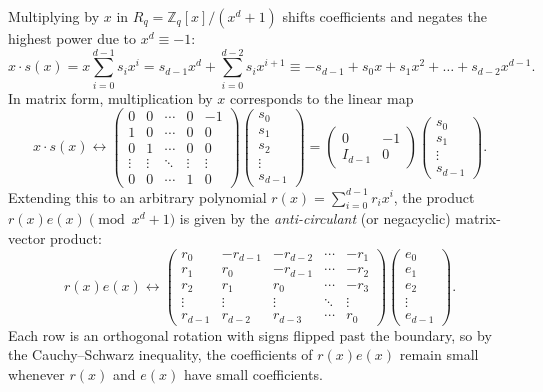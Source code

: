 Multiplying by \(x\) in \(R_q = \mathbb{Z}_q[x] / (x^d + 1)\) shifts coefficients and negates the highest power due to \(x^d \equiv -1\):
\[
    x \cdot s(x) = x \sum_{i=0}^{d-1} s_i x^i = s_{d-1} x^d + \sum_{i=0}^{d-2} s_i x^{i+1} \equiv -s_{d-1} + s_0 x + s_1 x^2 + \dots + s_{d-2} x^{d-1}.
\]
In matrix form, multiplication by \(x\) corresponds to the linear map
\[
    x \cdot s(x) \longleftrightarrow
    \begin{pmatrix}
        0 & 0 & \cdots & 0 & -1 \\
        1 & 0 & \cdots & 0 & 0 \\
        0 & 1 & \cdots & 0 & 0 \\
        \vdots & \vdots & \ddots & \vdots & \vdots \\
        0 & 0 & \cdots & 1 & 0
    \end{pmatrix}
    \begin{pmatrix}
        s_0 \\ s_1 \\ s_2 \\ \vdots \\ s_{d-1}
    \end{pmatrix}
    =
    \begin{pmatrix}
        0 & -1 \\
        I_{d-1} & 0
    \end{pmatrix}
    \begin{pmatrix}
        s_0 \\ s_1 \\ \vdots \\ s_{d-1}
    \end{pmatrix}.
\]
Extending this to an arbitrary polynomial \(r(x) = \sum_{i=0}^{d-1} r_i x^i\), the product \(r(x)e(x) \pmod{x^d + 1}\) is given by the \emph{anti-circulant} (or negacyclic) matrix-vector product:
\[
    r(x) e(x) \longleftrightarrow
    \begin{pmatrix}
        r_0 & -r_{d-1} & -r_{d-2} & \cdots & -r_1 \\
        r_1 & r_0      & -r_{d-1} & \cdots & -r_2 \\
        r_2 & r_1      & r_0      & \cdots & -r_3 \\
        \vdots & \vdots & \vdots  & \ddots & \vdots \\
        r_{d-1} & r_{d-2} & r_{d-3} & \cdots & r_0
    \end{pmatrix}
    \begin{pmatrix}
        e_0 \\ e_1 \\ e_2 \\ \vdots \\ e_{d-1}
    \end{pmatrix}.
\]
Each row is an orthogonal rotation with signs flipped past the boundary, so by the Cauchy--Schwarz inequality, the coefficients of \(r(x)e(x)\) remain small whenever \(r(x)\) and \(e(x)\) have small coefficients.

